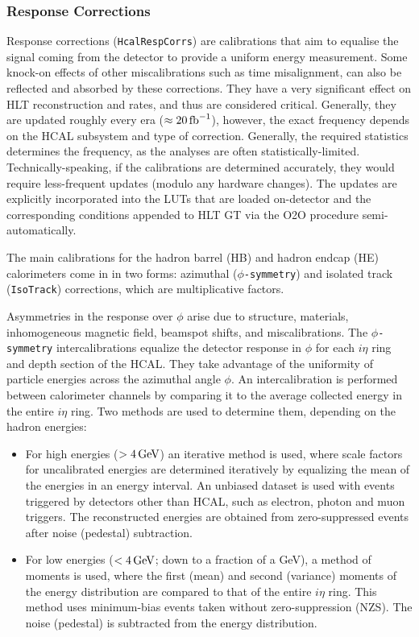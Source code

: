 \subsubsection{Response Corrections}
Response corrections (\texttt{HcalRespCorrs}) are calibrations that aim to equalise the signal coming from the detector to provide a uniform energy measurement. Some knock-on effects of other miscalibrations such as time misalignment, can also be reflected and absorbed by these corrections. They have a very significant effect on HLT reconstruction and rates, and thus are considered critical. Generally, they are updated roughly every era ($\approx 20 \mbox{\ensuremath{\,\text{fb}^{-1}}}$), however, the exact frequency depends on the HCAL subsystem and type of correction. Generally, the required statistics determines the frequency, as the analyses are often statistically-limited. Technically-speaking, if the calibrations are determined accurately, they would require less-frequent updates (modulo any hardware changes). The updates are explicitly incorporated into the LUTs that are loaded on-detector and the corresponding conditions appended to HLT GT via the O2O procedure semi-automatically.

The main calibrations for the hadron barrel (HB) and hadron endcap (HE) calorimeters come in in two forms: azimuthal ($\phi$\texttt{-symmetry}) and isolated track (\texttt{IsoTrack}) corrections, which are multiplicative factors. 

Asymmetries in the response over $\phi$ arise due to structure, materials, inhomogeneous magnetic field, beamspot shifts, and miscalibrations. The $\phi$\texttt{-symmetry} intercalibrations equalize the detector response in $\phi$ for each $i\eta$ ring and depth section of the HCAL. They take advantage of the uniformity of particle energies across the azimuthal angle $\phi$. An intercalibration is performed between calorimeter channels by comparing it to the average collected energy in the entire $i\eta$ ring. Two methods are used to determine them, depending on the hadron energies:
\begin{itemize}
    \item For high energies ($> 4 \,\text{Ge\hspace{-.08em}V}$) an iterative method is used, where scale factors for uncalibrated energies are determined iteratively by equalizing the mean of the energies in an energy interval. An unbiased dataset is used with events triggered by detectors other than HCAL, such as electron, photon and muon triggers. The reconstructed energies are obtained from zero-suppressed events after noise (pedestal) subtraction.
    \item For low energies ($< 4 \,\text{Ge\hspace{-.08em}V}$; down to a fraction of a GeV), a method of moments is used, where the first (mean) and second (variance) moments of the energy distribution are compared to that of the entire $i\eta$ ring. This method uses minimum-bias events taken without zero-suppression (NZS). The noise (pedestal) is subtracted from the energy distribution.
\end{itemize}

